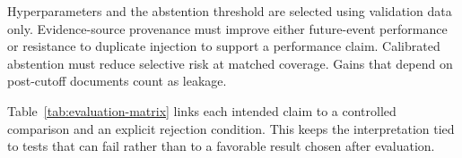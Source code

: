 Hyperparameters and the abstention threshold are selected using validation data only. Evidence-source provenance must improve either future-event performance or resistance to duplicate injection to support a performance claim. Calibrated abstention must reduce selective risk at matched coverage. Gains that depend on post-cutoff documents count as leakage.

Table~\ref{tab:evaluation-matrix} links each intended claim to a controlled comparison and an explicit rejection condition. This keeps the interpretation tied to tests that can fail rather than to a favorable result chosen after evaluation.




